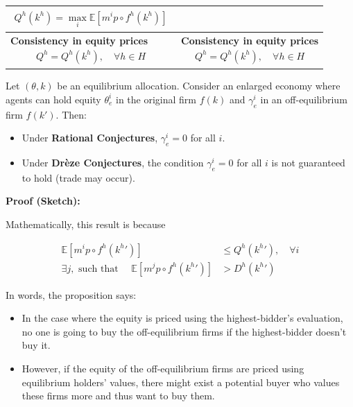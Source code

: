 \begin{table}[htbp]
\begin{tabular}{|m{8cm}|m{6cm}|}
\begin{align*}
Q^h(k^h) = \max_i \mathbb{E}[m^i p \circ f^h(k^h)]
\end{align*} 
\vspace{-2mm} \\ \hline
\noindent \textbf{Consistency in equity prices} 
\begin{align*}
Q^h = Q^h(k^h), \quad \forall h \in H
\end{align*} 
& 
\noindent \textbf{Consistency in equity prices} 
\begin{align*}
Q^h = Q^h(k^h), \quad \forall h \in H
\end{align*} 
\\ \hline
\end{tabular}
\label{table:equilibrium}
\end{table}

\begin{tcolorbox}
    \begin{proposition}
        Let $(\theta, k)$ be an equilibrium allocation. 
        Consider an enlarged economy where agents can hold equity 
        $\theta_e^i$ in the original firm $f(k)$ 
        and $\gamma_e^i$ in an off-equilibrium firm $f(k')$.
        Then:
        \begin{itemize}
            \item Under \textbf{Rational Conjectures}, $\gamma^i_e = 0$ for all $i$.
            \item Under \textbf{Drèze Conjectures}, the condition $\gamma^i_e = 0$ for all $i$ is not guaranteed to hold (trade may occur).
        \end{itemize}
    \end{proposition}
\end{tcolorbox}
\noindent \textbf{Proof (Sketch):}

Mathematically, this result is because

\begin{align*}
\mathbb{E}[m^i p \circ f^h({k^h}')] & \leq Q^h({k^h}'), \quad \forall i \\
\exists j, \text{ such that } \quad \mathbb{E}[m^j p \circ f^h({k^h}')] & > D^h({k^h}') 
\end{align*}

In words, the proposition says:
\begin{itemize}
    \item In the case where the equity is priced using the highest-bidder's evaluation,
    no one is going to buy the off-equilibrium firms if the highest-bidder doesn't buy it.
    \item However, if the equity of the off-equilibrium firms are priced using equilibrium holders' values,
    there might exist a potential buyer who values these firms more and thus want to buy them.
\end{itemize}

